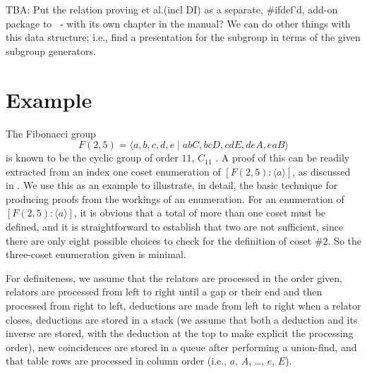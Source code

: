 


TBA:
Put the relation proving et al.\@ (incl DI) as a separate, \#ifdef'd,
  add-on package to \ace\ - with its own chapter in the manual?
We can do other things with this data structure; i.e., find a presentation
  for the subgroup in terms of the given subgroup generators.

\section{Example}

The Fibonacci group 
 $$ F(2,5) = \langle a,b,c,d,e \mid abC, bcD, cdE, deA, eaB \rangle $$
  is known to be the cyclic group of order $11$, $C_{11}$ \cite{Con65}.
A proof of this can be readily extracted from an index one coset 
  enumeration of $[F(2,5) : \langle a \rangle]$, as discussed in \cite{Lee77}.
We use this as an example to illustrate, in detail, the basic technique for
  producing proofs from the workings of an enumeration.
%
For an enumeration of $[F(2,5) : \langle a \rangle]$, it is obvious that a
  total of more than one coset must be defined, and it is straightforward
  to establish that two are not sufficient, since there are only eight
  possible choices to check for the definition of coset \#$2$.
So the three-coset enumeration given is minimal.

For definiteness, we assume that the relators are processed in the order
  given, relators are processed from left to right until a gap or their
  end and then processed from right to left, deductions are made from left
  to right when a relator closes, deductions are stored in a stack (we 
  assume that both a deduction and its inverse are stored, with the 
  deduction at the top to make explicit the processing order), new
  coincidences are stored in a queue after performing a union-find, and
  that table rows are processed in column order (i.e., 
  $a$, $A$, \dots, $e$, $E$).

